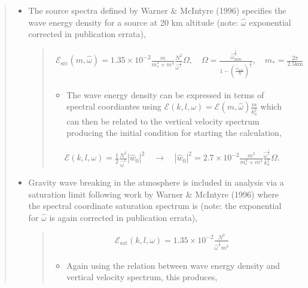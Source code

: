 \documentclass[letterpaper,10pt,english]{sphinxmanual}
\begin{document}
\begin{itemize}
\begin{quote}
\begin{itemize}
\begin{quote}
\begin{itemize}
\end{itemize}
\end{quote}

\item {} 
\sphinxAtStartPar
The source spectra defined by Warner \& McIntyre (1996) specifies the wave energy density for a source at 20 km altitude (note: \(\hat{\omega}\) exponential corrected in publication errata),
\begin{quote}
\begin{equation*}
\begin{split}\mathcal{E}_\text{src} \left(m, \hat{\omega} \right) = 1.35 \times 10^{-2} \frac{m}{m_*^4 + m^4} \frac{N^2}{\hat{\omega}^\frac{5}{3}} \Omega, \quad \Omega = \frac{\hat{\omega}_\text{min}^\frac{2}{3}}{1 - \left( \frac{\hat{\omega}_\text{min}}{N} \right)^\frac{2}{3}}, \quad m_* = \frac{2 \pi}{2.5 \text{km}}\end{split}
\end{equation*}\begin{itemize}
\item {} 
\sphinxAtStartPar
The wave energy density can be expressed in terms of spectral coordiantes using \(\mathcal{E} \left( k, l, \omega \right) = \mathcal{E} \left( m, \hat{\omega} \right) \frac{m}{k_h^2}\) which can then be related to the vertical velocity spectrum producing the initial condition for starting the calculation,

\end{itemize}
\begin{equation*}
\begin{split}\mathcal{E} \left(k, l, \omega \right) = \frac{1}{2} \frac{N^2}{\hat{\omega}^2} \left| \hat{w}_0 \right|^2 \quad \rightarrow \quad \left| \hat{w}_0 \right|^2 = 2.7 \times 10^{-2} \frac{m^2}{m^4_* + m^4}  \frac{\hat{\omega}^\frac{1}{3}}{k_h^2} \Omega.\end{split}
\end{equation*}\end{quote}

\item {} 
\sphinxAtStartPar
Gravity wave breaking in the atmosphere is included in analysis via a saturation limit following work by Warner \& McIntyre (1996) where the spectral coordinate saturation spectrum is (note: the exponential for \(\hat{\omega}\) is again corrected in publication errata),
\begin{quote}
\begin{equation*}
\begin{split}\mathcal{E}_\text{sat} \left(k, l, \omega \right) = 1.35 \times 10^{-2} \frac{N^2}{\hat{\omega}^\frac{5}{3} m^3}\end{split}
\end{equation*}\begin{itemize}
\item {} 
\sphinxAtStartPar
Again using the relation between wave energy density and vertical velocity spectrum, this produces,


\end{itemize}
\end{quote}
\end{itemize}
\end{quote}
\end{itemize}
\end{document}
